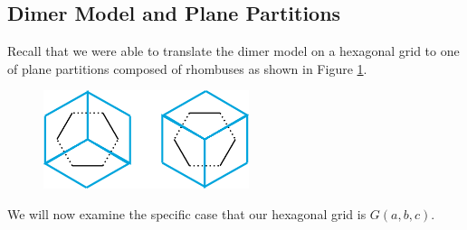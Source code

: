 \documentclass{article}
\begin{document}
	
\subsection*{Dimer Model and Plane Partitions}

\hspace{1cm} Recall that we were able to translate the dimer model on a hexagonal grid to one of plane partitions composed of rhombuses as shown in Figure \ref{fig:honey_rhombus}. 	
	\begin{figure}[h]
\begin{minipage}{\textwidth}
	\begin{center}
 	\includegraphics[width=6cm]{honey_rhombus.png}
  	\caption{}
	 \label{fig:honey_rhombus}
 	 \end{center}
 \end{minipage}	
\end{figure} 
We will now examine the specific case that our hexagonal grid is $G(a,b,c)$. 
\end{document}
